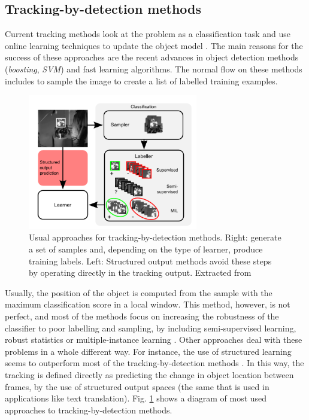 \subsection{Tracking-by-detection methods}

Current tracking methods look at the problem as a classification task and use online learning techniques to update the object model \cite{c23}. The main reasons for the success of these approaches are the recent advances in object detection
methods ({\it boosting}, {\it SVM}) and fast learning algorithms. 
The normal 
flow on these methods includes to 
sample the image to create a list 
of labelled training examples. 

   \begin{figure}[thpb]
      \centering
      \includegraphics[width=0.66\textwidth]{../images/tbd.png}
      \caption{Usual approaches for tracking-by-detection methods. Right: generate a set of samples and, depending on the type of learner, produce training labels. Left: Structured output methods avoid these steps by operating directly in the tracking output. Extracted from \cite{c23}}
      \label{tr_tbd}
   \end{figure}


Usually, the position of the object 
is computed from the sample with the maximum classification score in a local window. 
This method, however, is not perfect, and most of the methods 
focus on increasing the robustness 
of the classifier to poor labelling 
and sampling, by including semi-supervised learning, robust statistics or multiple-instance 
learning \cite{c25}. Other approaches deal with these problems 
in a whole different way. For instance, the use of structured learning seems to outperform most 
of the tracking-by-detection methods \cite{c23}. In this way, 
the tracking is defined directly 
as predicting the change in object location between frames, by the use 
of structured output spaces (the same that is used in applications like text translation). Fig. \ref{tr_tbd} shows a diagram of most used approaches to tracking-by-detection methods. 
   
